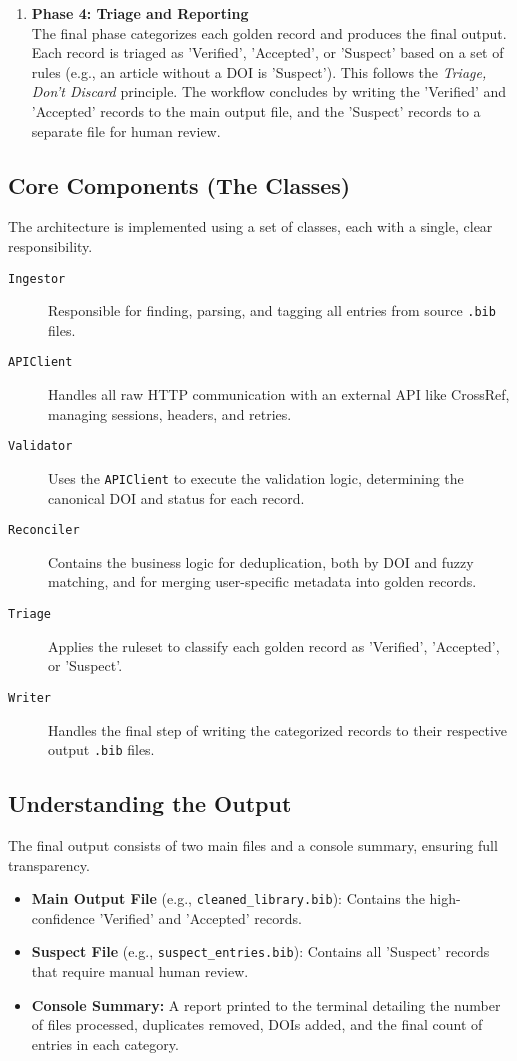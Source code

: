 \documentclass[11pt, a4paper]{article}
\begin{document}
\begin{enumerate}[label=\arabic*.]
    \item \textbf{Phase 4: Triage and Reporting} \\
    The final phase categorizes each golden record and produces the final output. Each record is triaged as 'Verified', 'Accepted', or 'Suspect' based on a set of rules (e.g., an article without a DOI is 'Suspect'). This follows the \textit{Triage, Don't Discard} principle. The workflow concludes by writing the 'Verified' and 'Accepted' records to the main output file, and the 'Suspect' records to a separate file for human review.
\end{enumerate}

\subsection{Core Components (The Classes)}
The architecture is implemented using a set of classes, each with a single, clear responsibility.

\begin{description}
    \item[\texttt{Ingestor}] Responsible for finding, parsing, and tagging all entries from source \texttt{.bib} files.
    \item[\texttt{APIClient}] Handles all raw HTTP communication with an external API like CrossRef, managing sessions, headers, and retries.
    \item[\texttt{Validator}] Uses the \texttt{APIClient} to execute the validation logic, determining the canonical DOI and status for each record.
    \item[\texttt{Reconciler}] Contains the business logic for deduplication, both by DOI and fuzzy matching, and for merging user-specific metadata into golden records.
    \item[\texttt{Triage}] Applies the ruleset to classify each golden record as 'Verified', 'Accepted', or 'Suspect'.
    \item[\texttt{Writer}] Handles the final step of writing the categorized records to their respective output \texttt{.bib} files.
\end{description}

\subsection{Understanding the Output}
The final output consists of two main files and a console summary, ensuring full transparency.
\begin{itemize}[leftmargin=*]
    \item \textbf{Main Output File} (e.g., \texttt{cleaned\_library.bib}): Contains the high-confidence 'Verified' and 'Accepted' records.
    \item \textbf{Suspect File} (e.g., \texttt{suspect\_entries.bib}): Contains all 'Suspect' records that require manual human review.
    \item \textbf{Console Summary:} A report printed to the terminal detailing the number of files processed, duplicates removed, DOIs added, and the final count of entries in each category.
\end{itemize}
\end{document}
